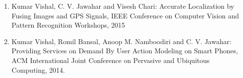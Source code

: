 \begin{enumerate}
\item Kumar Vishal, C. V. Jawahar and Visesh Chari: Accurate Localization by Fusing Images and GPS Signals, IEEE Conference on Computer Vision and Pattern Recognition Workshops, 2015\\
\item Kumar Vishal, Romil Bansal, Anoop M. Namboodiri and C. V. Jawahar: Providing Services on Demand By User Action Modeling on Smart Phones, ACM International Joint Conference on Pervasive and Ubiquitous Computing, 2014.
\end{enumerate}
